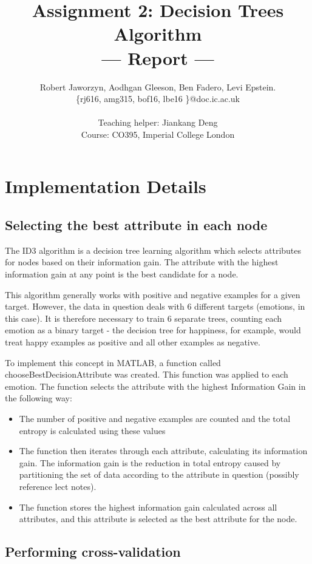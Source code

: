 \documentclass[a4paper,11pt]{article}
\title{Assignment 2: Decision Trees Algorithm\\\Large{--- Report ---}}
\author{Robert Jaworzyn, Aodhgan Gleeson, Ben Fadero, Levi Epstein.\\
       \{rj616, amg315, bof16, lbe16 \}@doc.ic.ac.uk\\ \\
       \small{Teaching helper: Jiankang Deng}\\
       \small{Course: CO395, Imperial College London}
}
\begin{document}
\maketitle

\section{Implementation Details}

\subsection{Selecting the best attribute in each node}
 
The ID3 algorithm is a decision tree learning algorithm which selects attributes for nodes based on their information gain. The attribute with the highest information gain at any point is the best candidate for a node.

This algorithm generally works with positive and negative examples for a given target. However, the data in question deals with 6 different targets (emotions, in this case). It is therefore necessary to train 6 separate trees, counting each emotion as a binary target - the decision tree for happiness, for example, would treat happy examples as positive and all other examples as negative. 

To implement this concept in MATLAB, a function called chooseBestDecisionAttribute was created. This function was applied to each emotion. The function selects the attribute with the highest Information Gain in the following way:

\begin{itemize}
	\item The number of positive and negative examples are counted and the total entropy is calculated using these values
	\item The function then iterates through each attribute, calculating its information gain. The information gain is the reduction in total entropy caused by partitioning the set of data according to the attribute in question (possibly reference lect notes).  
	\item The function stores the highest information gain calculated across all attributes, and this attribute is selected as the best attribute for the node.
\end{itemize}
\subsection{Performing cross-validation}
\end{document}
